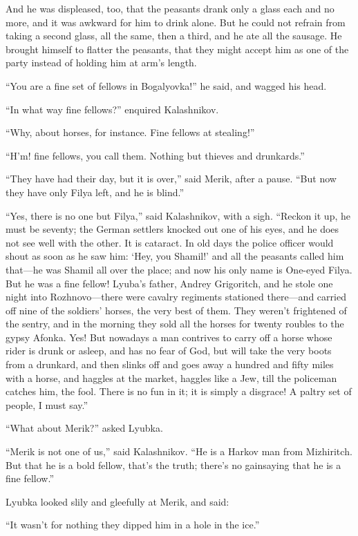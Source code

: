 And he was displeased, too, that the peasants drank only a glass each
and no more, and it was awkward for him to drink alone. But he could not
refrain from taking a second glass, all the same, then a third, and he
ate all the sausage. He brought himself to flatter the peasants, that
they might accept him as one of the party instead of holding him at
arm’s length.

“You are a fine set of fellows in Bogalyovka!” he said, and wagged his
head.

“In what way fine fellows?” enquired Kalashnikov.

“Why, about horses, for instance. Fine fellows at stealing!”

“H’m! fine fellows, you call them. Nothing but thieves and drunkards.”

“They have had their day, but it is over,” said Merik, after a pause.
“But now they have only Filya left, and he is blind.”

“Yes, there is no one but Filya,” said Kalashnikov, with a sigh. “Reckon
it up, he must be seventy; the German settlers knocked out one of his
eyes, and he does not see well with the other. It is cataract. In old
days the police officer would shout as soon as he saw him: ‘Hey, you
Shamil!’ and all the peasants called him that—he was Shamil all over the
place; and now his only name is One-eyed Filya. But he was a fine
fellow! Lyuba’s father, Andrey Grigoritch, and he stole one night into
Rozhnovo—there were cavalry regiments stationed there—and carried off
nine of the soldiers’ horses, the very best of them. They weren’t
frightened of the sentry, and in the morning they sold all the horses
for twenty roubles to the gypsy Afonka. Yes! But nowadays a man
contrives to carry off a horse whose rider is drunk or asleep, and has
no fear of God, but will take the very boots from a drunkard, and then
slinks off and goes away a hundred and fifty miles with a horse, and
haggles at the market, haggles like a Jew, till the policeman catches
him, the fool. There is no fun in it; it is simply a disgrace! A paltry
set of people, I must say.”

“What about Merik?” asked Lyubka.

“Merik is not one of us,” said Kalashnikov. “He is a Harkov man from
Mizhiritch. But that he is a bold fellow, that’s the truth; there’s no
gainsaying that he is a fine fellow.”

Lyubka looked slily and gleefully at Merik, and said:

“It wasn’t for nothing they dipped him in a hole in the ice.”

